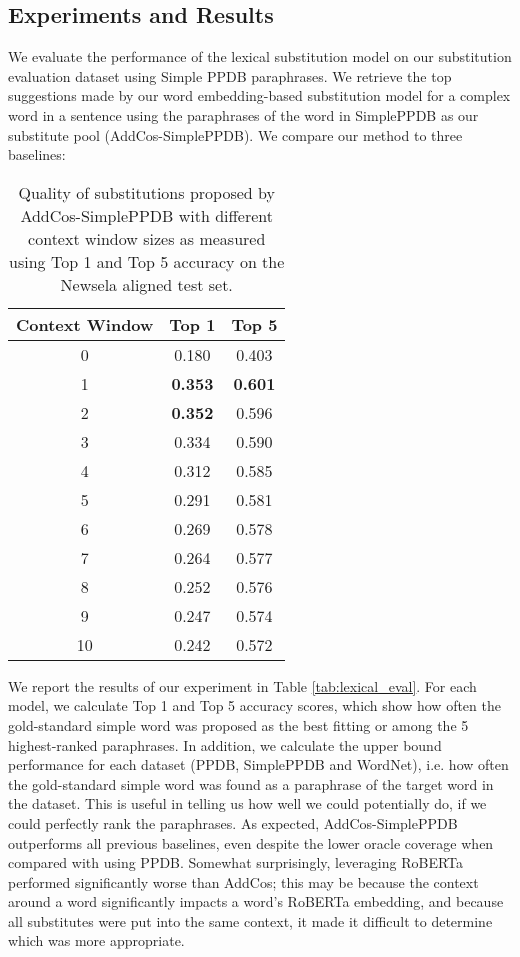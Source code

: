 \documentclass[thesis.tex]{subfiles}
\begin{document}
\subsection{Experiments and Results} \label{sec:lex_experiments}

We evaluate the performance of the lexical substitution model on our substitution evaluation dataset using Simple PPDB paraphrases. We retrieve the top suggestions made by our word embedding-based substitution model for a complex word in a sentence using the paraphrases of the word in SimplePPDB as our substitute pool (AddCos-SimplePPDB). We compare our method to three baselines:

\begin{table}
	\small
	\centering
	\begin{tabular}{|c||c|c|}
		\hline \bf Context Window & \bf Top 1 & \bf Top 5 \\ \hline
0 & 0.180 & 0.403 \\
1 & \textbf{0.353} & \textbf{0.601} \\
2 & \textbf{0.352} & 0.596 \\ 
3 & 0.334 & 0.590 \\
4 & 0.312 & 0.585 \\
5 & 0.291 & 0.581 \\
6 & 0.269 & 0.578 \\
7 & 0.264 & 0.577 \\
8 & 0.252 & 0.576 \\
9 & 0.247 & 0.574 \\
10 & 0.242 & 0.572 \\ \hline
	\end{tabular}
	\caption{Quality of substitutions proposed by AddCos-SimplePPDB with different context window sizes as measured using Top 1 and Top 5 accuracy on the Newsela aligned test set.}
	\label{tab:context-window}
\end{table}

We report the results of our experiment in Table \ref{tab:lexical_eval}. For each model, we calculate Top 1 and Top 5 accuracy scores, which show how often the gold-standard simple word was proposed as the best fitting or among the 5 highest-ranked paraphrases. In addition, we calculate the upper bound performance for each dataset (PPDB, SimplePPDB and WordNet), i.e. how often the gold-standard simple word was found as a paraphrase of the target word in the dataset. This is useful in telling us how well we could potentially do, if we could perfectly rank the paraphrases. As expected, AddCos-SimplePPDB outperforms all previous baselines, even despite the lower oracle coverage when compared with using PPDB. Somewhat surprisingly, leveraging RoBERTa performed significantly worse than AddCos; this may be because the context around a word significantly impacts a word's RoBERTa embedding, and because all substitutes were put into the same context, it made it difficult to determine which was more appropriate.
\end{document}
